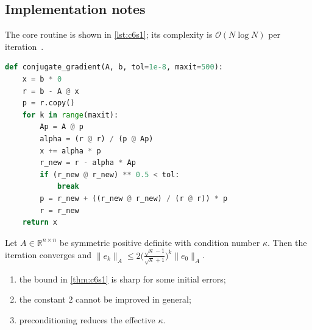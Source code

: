 \kant[9-11]

\subsection{Implementation notes}\label{sec:c6s1-i}
The core routine is shown in \cref{lst:c6s1}; its complexity is $\mathcal{O}(N\log N)$ per iteration~\cite{ch6-7}.

\begin{lstlisting}[language=python,caption={Reference implementation for c6s1.},label={lst:c6s1}]
def conjugate_gradient(A, b, tol=1e-8, maxit=500):
    x = b * 0
    r = b - A @ x
    p = r.copy()
    for k in range(maxit):
        Ap = A @ p
        alpha = (r @ r) / (p @ Ap)
        x += alpha * p
        r_new = r - alpha * Ap
        if (r_new @ r_new) ** 0.5 < tol:
            break
        p = r_new + ((r_new @ r_new) / (r @ r)) * p
        r = r_new
    return x
\end{lstlisting}

\kant[3-10]
\begin{theorem}\label{thm:c6s1}
Let $A\in\mathbb{R}^{n\times n}$ be symmetric positive definite with condition number $\kappa$. Then the iteration converges and
$\lVert e_k\rVert_A \le 2\bigl(\tfrac{\sqrt\kappa-1}{\sqrt\kappa+1}\bigr)^k\lVert e_0\rVert_A$.
\end{theorem}
\begin{enumerate}[label=(\roman*)]
\item the bound in \cref{thm:c6s1} is sharp for some initial errors;
\item the constant $2$ cannot be improved in general;
\item preconditioning reduces the effective $\kappa$.
\end{enumerate}

\lipsum[94-94]
